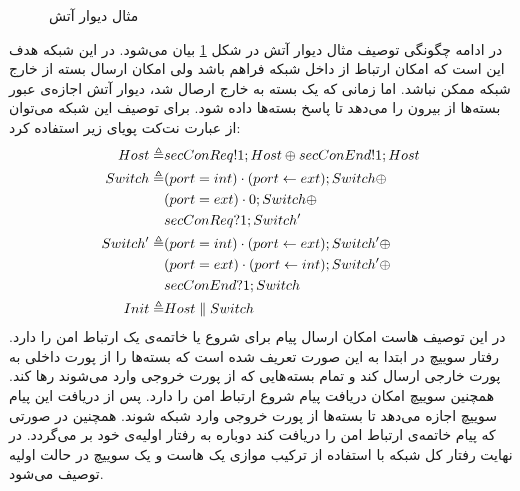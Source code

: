\begin{figure}
    \centering
    \caption{مثال دیوار آتش}
    \label{dynetkat:firewall}
\end{figure}

در ادامه چگونگی توصیف مثال دیوار آتش در شکل
\ref{dynetkat:firewall}
بیان می‌شود.
در این شبکه هدف این است که امکان ارتباط از داخل شبکه فراهم باشد ولی امکان ارسال بسته از خارج شبکه ممکن نباشد.
اما زمانی که یک بسته به خارج ارصال شد، دیوار آتش اجازه‌ی عبور بسته‌ها از بیرون را می‌دهد تا پاسخ بسته‌ها داده شود.
برای توصیف این شبکه می‌توان از عبارت نت‌کت پویای زیر استفاده کرد:
\begin{align*}
    Host  \triangleq   & secConReq!1;Host \oplus secConEnd!1;Host        \\
    Switch \triangleq  & (port = int) \cdot (port \leftarrow ext);Switch \oplus \\
                       & (port = ext)\cdot 0 ; Switch \oplus             \\
                       & secConReq?1;Switch'                             \\
    Switch' \triangleq & (port =int) \cdot (port \leftarrow ext);Switch' \oplus \\
                       & (port=ext)\cdot(port\leftarrow int);Switch' \oplus     \\
                       & secConEnd?1;Switch                              \\
    Init \triangleq    & Host \parallel Switch
\end{align*}
در این توصیف هاست امکان ارسال پیام برای شروع یا خاتمه‌ی یک ارتباط امن را دارد.
رفتار سوییچ در ابتدا به این صورت تعریف شده است که بسته‌ها را از پورت داخلی به پورت خارجی ارسال کند و تمام بسته‌هایی که از پورت خروجی وارد می‌شوند رها کند.
همچنین سوییچ امکان دریافت پیام شروع ارتباط امن را دارد.
پس از دریافت این پیام سوییچ اجازه می‌دهد تا بسته‌ها از پورت خروجی وارد شبکه شوند.
همچنین در صورتی که پیام خاتمه‌ی ارتباط امن را دریافت کند دوباره به رفتار اولیه‌ی خود بر می‌گردد.
در نهایت رفتار کل شبکه با استفاده از ترکیب موازی یک هاست و یک سوییچ در حالت اولیه توصیف می‌شود.

